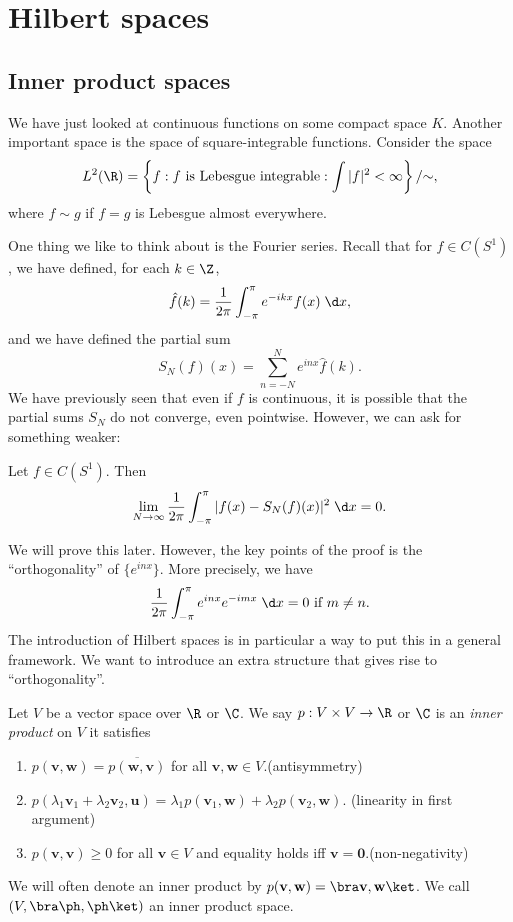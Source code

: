 \documentclass[a4paper]{article}
\begin{document}
\section{Hilbert spaces}
\subsection{Inner product spaces}
We have just looked at continuous functions on some compact space $K$. Another important space is the space of square-integrable functions. Consider the space
\[
  L^2(\R) = \left\{f: f\text{ is Lebesgue integrable} : \int |f|^2 < \infty\right\} / {\sim},
\]
where $f \sim g$ if $f = g$ is Lebesgue almost everywhere.

One thing we like to think about is the Fourier series. Recall that for $f \in C(S^1)$, we have defined, for each $k \in \Z$,
\[
  \hat{f}(k) = \frac{1}{2\pi} \int_{-\pi}^\pi e^{-ikx}f(x)\;\d x,
\]
and we have defined the partial sum
\[
  S_N(f)(x) = \sum_{n = -N}^N e^{inx} \hat{f}(k).
\]
We have previously seen that even if $f$ is continuous, it is possible that the partial sums $S_N$ do not converge, even pointwise. However, we can ask for something weaker:

\begin{prop}
  Let $f \in C(S^1)$. Then
  \[
    \lim_{N \to \infty} \frac{1}{2\pi}\int_{-\pi}^\pi |f(x) - S_N(f)(x)|^2 \;\d x = 0.
  \]
\end{prop}
We will prove this later. However, the key points of the proof is the ``orthogonality'' of $\{e^{inx}\}$. More precisely, we have
\[
  \frac{1}{2\pi} \int_{-\pi}^\pi e^{inx}e^{-imx} \;\d x = 0\text{ if } m\not= n.
\]
The introduction of Hilbert spaces is in particular a way to put this in a general framework. We want to introduce an extra structure that gives rise to ``orthogonality''.

\begin{defi}
  Let $V$ be a vector space over $\R$ or $\C$. We say $p: V \times V \to \R$ or $\C$ is an \emph{inner product} on $V$ it satisfies
  \begin{enumerate}
    \item $p(\mathbf{v}, \mathbf{w}) = \overline{p(\mathbf{w}, \mathbf{v})}$ for all $\mathbf{v}, \mathbf{w} \in V$.\hfill(antisymmetry)
    \item $p(\lambda_1 \mathbf{v}_1 + \lambda_2 \mathbf{v}_2, \mathbf{u}) = \lambda_1 p(\mathbf{v}_1, \mathbf{w}) + \lambda_2 p(\mathbf{v}_2, \mathbf{w})$. \hfill(linearity in first argument)
    \item $p(\mathbf{v}, \mathbf{v}) \geq 0$ for all $\mathbf{v} \in V$ and equality holds iff $\mathbf{v} = \mathbf{0}$.\hfill(non-negativity)
  \end{enumerate}
  We will often denote an inner product by $p(\mathbf{v}, \mathbf{w}) = \bra \mathbf{v}, \mathbf{w}\ket$. We call $(V, \bra\ph ,\ph \ket)$ an inner product space.
\end{defi}
\end{document}
